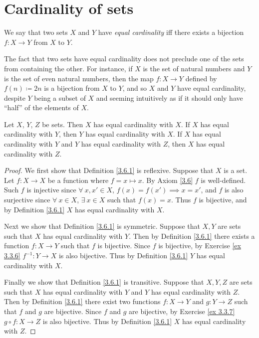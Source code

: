 \section{Cardinality of sets}\label{sec 3.6}

\begin{definition}\label{3.6.1}
We say that two sets \(X\) and \(Y\) have \emph{equal cardinality} iff there exists a bijection \(f : X \to Y\) from \(X\) to \(Y\).
\end{definition}

\setcounter{theorem}{2}
\begin{remark}\label{3.6.3}
The fact that two sets have equal cardinality does not preclude one of the sets from containing the other.
For instance, if \(X\) is the set of natural numbers and \(Y\) is the set of even natural numbers, then the map \(f : X \to Y\) defined by \(f(n) \coloneqq 2n\) is a bijection from \(X\) to \(Y\), and so \(X\) and \(Y\) have equal cardinality, despite \(Y\) being a subset of \(X\) and seeming intuitively as if it should only have ``half'' of the elements of \(X\).
\end{remark}

\begin{proposition}\label{3.6.4}
Let \(X\), \(Y\), \(Z\) be sets.
Then \(X\) has equal cardinality with \(X\).
If \(X\) has equal cardinality with \(Y\), then \(Y\) has equal cardinality with \(X\).
If \(X\) has equal cardinality with \(Y\) and \(Y\) has equal cardinality with \(Z\), then \(X\) has equal cardinality with \(Z\).
\end{proposition}

\begin{proof}
We first show that Definition \ref{3.6.1} is reflexive.
Suppose that \(X\) is a set.
Let \(f : X \to X\) be a function where \(f = x \mapsto x\).
By Axiom \ref{3.6} \(f\) is well-defined.
Such \(f\) is injective since \(\forall\ x, x' \in X\), \(f(x) = f(x') \implies x = x'\), and \(f\) is also surjective since \(\forall\ x \in X\), \(\exists\ x \in X\) such that \(f(x) = x\).
Thus \(f\) is bijective, and by Definition \ref{3.6.1} \(X\) has equal cardinality with \(X\).

Next we show that Definition \ref{3.6.1} is symmetric.
Suppose that \(X, Y\) are sets such that \(X\) has equal cardinality with \(Y\).
Then by Definition \ref{3.6.1} there exists a function \(f : X \to Y\) such that \(f\) is bijective.
Since \(f\) is bijective, by Exercise \ref{ex 3.3.6} \(f^{-1} : Y \to X\) is also bijective.
Thus by Definition \ref{3.6.1} \(Y\) has equal cardinality with \(X\).

Finally we show that Definition \ref{3.6.1} is transitive.
Suppose that \(X, Y, Z\) are sets such that \(X\) has equal cardinality with \(Y\) and \(Y\) has equal cardinality with \(Z\).
Then by Definition \ref{3.6.1} there exist two functions \(f : X \to Y\) and \(g : Y \to Z\) such that \(f\) and \(g\) are bijective.
Since \(f\) and \(g\) are bijective, by Exercise \ref{ex 3.3.7} \(g \circ f : X \to Z\) is also bijective.
Thus by Definition \ref{3.6.1} \(X\) has equal cardinality with \(Z\).
\end{proof}

